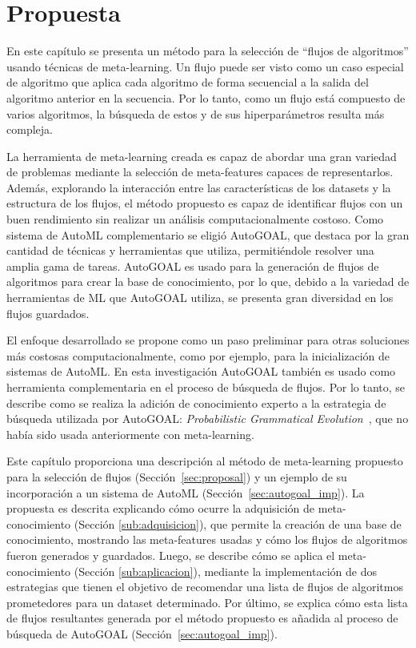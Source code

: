 \chapter{Propuesta}\label{chapter:proposal}


%

En este capítulo se presenta un método para la selección de ``flujos de algoritmos'' usando técnicas de meta-learning. Un flujo puede ser visto como un caso especial de algoritmo que aplica cada algoritmo de forma secuencial a la salida del algoritmo anterior en la secuencia. Por lo tanto, como un flujo está compuesto de varios algoritmos, la búsqueda de estos y de sus hiperparámetros resulta más compleja. 

La herramienta de meta-learning creada es capaz de abordar una gran variedad de problemas mediante la selección de meta-features capaces de representarlos. Además, explorando la interacción entre las características de los datasets y la estructura de los flujos, el método propuesto es capaz de identificar flujos con un buen rendimiento sin realizar un análisis computacionalmente costoso. Como sistema de AutoML complementario se eligió AutoGOAL, que destaca por la gran cantidad de técnicas y herramientas que utiliza, permitiéndole resolver una amplia gama de tareas. AutoGOAL es usado para la generación de flujos de algoritmos para crear la base de conocimiento, por lo que, debido a la variedad de herramientas de ML que AutoGOAL utiliza, se presenta gran diversidad en los flujos guardados.


El enfoque desarrollado se propone como un paso preliminar para otras soluciones más costosas computacionalmente, como por ejemplo, para la inicialización de sistemas de AutoML. En esta investigación AutoGOAL también es usado como herramienta complementaria en el proceso de búsqueda de flujos. Por lo tanto, se describe como se realiza la adición de conocimiento experto a la estrategia de búsqueda utilizada por AutoGOAL: \textit{Probabilistic Grammatical Evolution}~\cite{pge2015}, que no había sido usada anteriormente con meta-learning.


Este capítulo proporciona una descripción al método de meta-learning propuesto para la selección de flujos (Sección~\ref{sec:proposal}) y un ejemplo de su incorporación a un sistema de AutoML (Sección~\ref{sec:autogoal_imp}). La propuesta es descrita explicando cómo ocurre la adquisición de meta-conocimiento (Sección \ref{sub:adquisicion}), que permite la creación de una base de conocimiento, mostrando las meta-features usadas y cómo los flujos de algoritmos fueron generados y guardados. Luego, se describe cómo se aplica el meta-conocimiento (Sección \ref{sub:aplicacion}), mediante la implementación de dos estrategias que tienen el objetivo de recomendar una lista de flujos de algoritmos prometedores para un dataset determinado. Por último, se explica cómo esta lista de flujos resultantes generada por el método propuesto es añadida al proceso de búsqueda de AutoGOAL (Sección~\ref{sec:autogoal_imp}).

